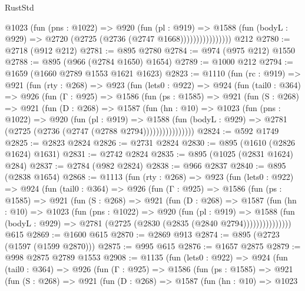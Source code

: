 \begin{lexlean}{RustStd}
\begin{coremodule}
{\begin{coremodule}
{{{{{{{{{                      @1023
                        (fun (pns : @1022) =>
                        @920
                          (fun (pl : @919) =>
                          @1588
                            (fun (bodyL : @929) => @2720 (@2725 (@2736 (@2747 @1668))))))))))))))))
    @212
@2780 := @2718 (@912 @212)
@2781 := @895 @2780
@2784 := @974 (@975 @212) @1550
@2788 := @895 (@966 (@2784 @1650) @1654)
@2789 := @1000 @212
@2794 := @1659 (@1660 @2789 @1553 @1621 @1623)
@2823 := @1110
    (fun (rc : @919) =>
    @921
      (fun (rty : @268) =>
      @923
        (fun (lets0 : @922) =>
        @924
          (fun (tail0 : @364) =>
          @926
            (fun (Γ : @925) =>
            @1586
              (fun (ps : @1585) =>
              @921
                (fun (S : @268) =>
                @921
                  (fun (D : @268) =>
                  @1587
                    (fun (hn : @10) =>
                    @1023
                      (fun (pns : @1022) =>
                      @920
                        (fun (pl : @919) =>
                        @1588
                          (fun (bodyL : @929) =>
                          @2781 (@2725 (@2736 (@2747 (@2788 @2794))))))))))))))))
@2824 := @592 @1749
@2825 := @2823 @2824
@2826 := @2731 @2824
@2830 := @895 (@1610 (@2826 @1624) @1631)
@2831 := @2742 @2824
@2835 := @895 (@1025 (@2831 @1624) @284)
@2837 := @2784 (@982 @2824)
@2838 := @966 @2837
@2840 := @895 (@2838 @1654)
@2868 := @1113
    (fun (rty : @268) =>
    @923
      (fun (lets0 : @922) =>
      @924
        (fun (tail0 : @364) =>
        @926
          (fun (Γ : @925) =>
          @1586
            (fun (ps : @1585) =>
            @921
              (fun (S : @268) =>
              @921
                (fun (D : @268) =>
                @1587
                  (fun (hn : @10) =>
                  @1023
                    (fun (pns : @1022) =>
                    @920
                      (fun (pl : @919) =>
                      @1588
                        (fun (bodyL : @929) =>
                        @2781 (@2725 (@2830 (@2835 (@2840 @2794)))))))))))))))
    @615
@2869 := @1600 @615
@2870 := @2869 @913
@2874 := @895 (@2723 (@1597 (@1599 @2870)))
@2875 := @995 @615
@2876 := @1657 @2875
@2879 := @998 @2875 @2789 @1553
@2908 := @1135
    (fun (lets0 : @922) =>
    @924
      (fun (tail0 : @364) =>
      @926
        (fun (Γ : @925) =>
        @1586
          (fun (ps : @1585) =>
          @921
            (fun (S : @268) =>
            @921
              (fun (D : @268) =>
              @1587
                (fun (hn : @10) =>
                @1023
}}}}}}}}}
\end{coremodule}}
\end{coremodule}
\end{lexlean}
